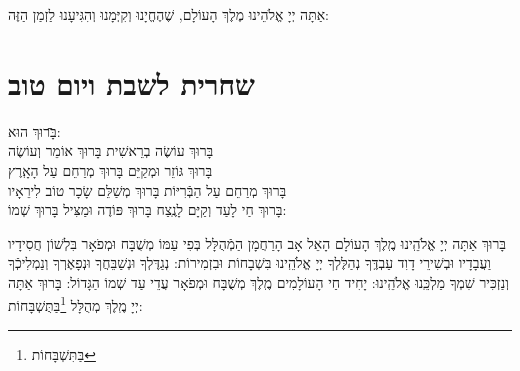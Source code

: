 \documentclass[twoside, openany, parskip=half, 11pt]{book}
\begin{document}
 אַתָּה יְיָ אֱלֹהֵינוּ מֶלֶךְ הָעוֹלָם, שֶׁהֶחֱיָנוּ וְקִיְּמָנוּ וְהִגִּיעָנוּ לַזְמַן הַזֶּה:



\chapter[שחרית לשבת ויום טוב]{ שחרית לשבת ויום טוב }

\begin{tabbing}

 \hspace{.5in} \=  בָּרוּךְ הוּא: \\
 בָּרוּךְ עוֹשֶׂה בְרֵאשִׁית \>  בָּרוּךְ אוֹמֵר וְעוֹשֶׂה  \\
 בָּרוּךְ גּוֹזֵר וּמְקַיֵּם \>  בָּרוּךְ מְרַחֵם עַל הָאָֽרֶץ  \\
 בָּרוּךְ מְרַחֵם עַל הַבְּֿרִיּוֹת \> בָּרוּךְ מְשַׁלֵּם שָׂכָר טוֹב לִירֵאָיו  \\
 בָּרוּךְ חַי לָעַד וְקַיָּם לָנֶֽצַח \> בָּרוּךְ פּוֹדֶה וּמַצִּיל   בָּרוּךְ שְׁמוֹ:  \\
   \end{tabbing}
   \vspace{-2\baselineskip}
  בָּרוּךְ אַתָּה יְיָ אֱלֹהֵֽינוּ מֶֽלֶךְ הָעוֹלָם הָאֵל אָב הָרַחֲמָן הַמְֿהֻלָּל בְּפִי עַמּוֹ מְשֻׁבָּח וּמְפֹאָר בִּלְשׁוֹן חֲסִידָיו וַעֲבָדָיו וּבְשִׁירֵי דָוִד עַבְדֶּֽךָ נְהַלֶּלְךָ יְיָ אֱלֹהֵֽינוּ בִּשְׁבָחוֹת וּבִזְמִירוֹת: נְגַדֶּלְךָ וּנְשַׁבֵּחֲךָ וּנְפָאֶרְךָ וְנַמְלִיכְֿךָ וְנַזְכִּיר שִׁמְךָ מַלְכֵּֽנוּ אֱלֹהֵֽינוּ:
יָחִיד חַי הָעוֹלָמִים מֶֽלֶךְ מְשֻׁבָּח וּמְפֹאָר עֲדֵי עַד שְׁמוֹ הַגָּדוֹל: בָּרוּךְ אַתָּה יְיָ מֶֽלֶךְ מְהֻלָּל \footnote{בַּתִּשְׁבָּחוֹת}בַּתֻּשְׁבָּחוֹת:
\end{document}
